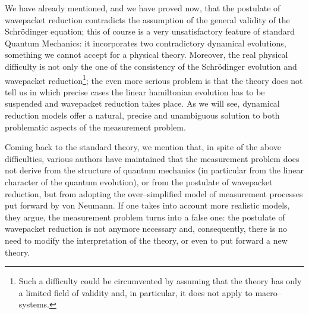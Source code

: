 \documentclass[10pt,a4paper]{article}
\begin{document}
We have already mentioned, and we have proved now, that the
postulate of wavepacket reduction contradicts the assumption of
the general validity of the Schr\"odinger equation; this of course
is a very unsatisfactory feature of standard Quantum Mechanics: it
incorporates two contradictory dynamical evolutions, something we
cannot accept for a physical theory. Moreover, the real physical
difficulty is not only the one of the consistency of the
Schr\"odinger evolution and wavepacket reduction\footnote{Such a
difficulty could be circumvented by assuming that the theory has
only a limited field of validity and, in particular, it does not
apply to macro--systems.}; the even more serious problem is that
the theory does not tell us in which precise cases the linear
hamiltonian evolution has to be suspended and wavepacket reduction
takes place. As we will see, dynamical reduction models offer a
natural, precise and unambiguous solution to both problematic
aspects of the measurement problem.

Coming back to the standard theory, we mention that, in spite of
the above difficulties, various authors \cite{pri,zur1,zu,lib}
have maintained that the measurement problem does not derive from
the structure of quantum mechanics (in  particular from the linear
character of the quantum evolution), or from the postulate of
wavepacket reduction, but from adopting the over--simplified model
of measurement processes put forward by von Neumann. If one takes
into account more realistic models, they argue, the measurement
problem turns into a false one: the postulate of wavepacket
reduction is not anymore necessary and, consequently, there is no
need to modify the interpretation of the theory, or even to put
forward a new theory.
\end{document}
